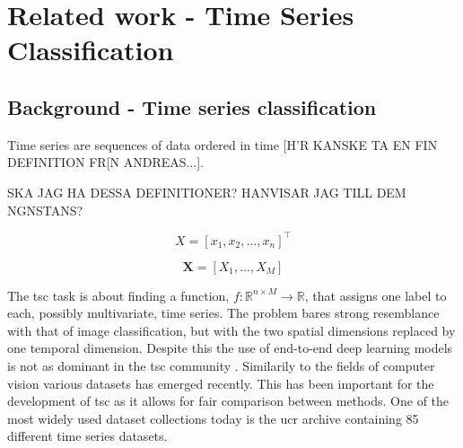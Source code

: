 \chapter{Related work - Time Series Classification} \label{sec:tsc}
\section{Background - Time series classification}
Time series are sequences of data ordered in time [H'R KANSKE TA EN FIN DEFINITION FR[N ANDREAS...].

SKA JAG HA DESSA DEFINITIONER? HANVISAR JAG TILL DEM NGNSTANS?

\begin{definition}
  $$X = \left[x_1, x_2, \hdots, x_n\right]^\intercal$$
  \label{def:uts}
\end{definition}

\begin{definition}
    $$\pmb{X} = \left[X_1, \hdots, X_M\right]$$
\end{definition}

The \gls{tsc} task is about finding a function, $f: \mathbb{R}^{n \times M} \rightarrow \mathbb{R}$, that assigns one label to each, possibly multivariate, time series. The problem bares strong resemblance with that of image classification, but with the two spatial dimensions replaced by one temporal dimension. Despite this the use of end-to-end deep learning models is not as dominant in the \gls{tsc} community \cite{IsmailFawaz2019}. Similarily to the fields of computer vision various datasets has emerged recently. This has been important for the development of \gls{tsc} as it allows for fair comparison between methods. One of the most widely used dataset collections today is the \gls{ucr} archive \cite{Dau2018} containing 85 different time series datasets.

